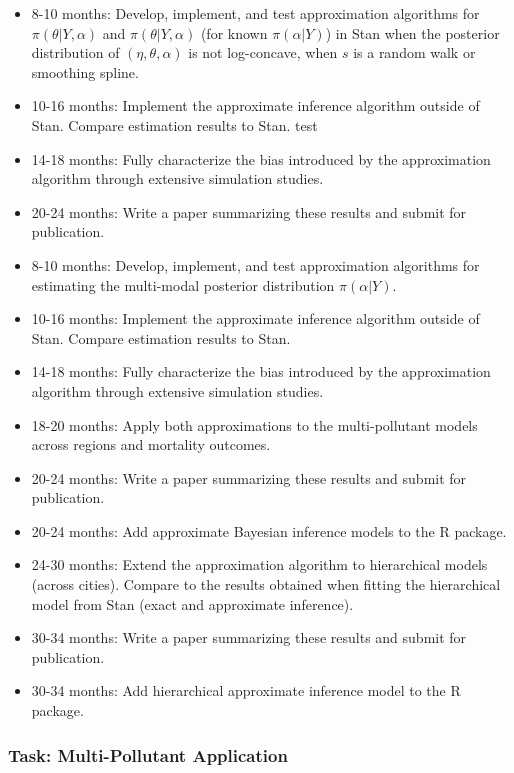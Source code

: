 \documentclass[12pt,letterpaper]{article}
\begin{document}
\begin{itemize}
    \item 8-10 months: Develop, implement, and test approximation algorithms for $\pi( \theta | Y, \alpha )$ and $\pi( \theta | Y, \alpha )$ (for known $\pi(\alpha|Y)$) in Stan when the posterior distribution of $(\eta, \theta, \alpha)$ is not log-concave, when $s$ is a random walk or smoothing spline. 
    \item 10-16 months: Implement the approximate inference algorithm outside of Stan. Compare estimation results to Stan. test 
    \item 14-18 months: Fully characterize the bias introduced by the approximation algorithm through extensive simulation studies. 
    \item 20-24 months: Write a paper summarizing these results and submit for publication. 
    \item 8-10 months: Develop, implement, and test approximation algorithms for estimating the multi-modal posterior distribution $\pi(\alpha|Y)$.
    \item 10-16 months: Implement the approximate inference algorithm outside of Stan. Compare estimation results to Stan.  
    \item 14-18 months: Fully characterize the bias introduced by the approximation algorithm through extensive simulation studies.  
    \item 18-20 months: Apply both approximations to the multi-pollutant models across regions and mortality outcomes.
    \item 20-24 months: Write a paper summarizing these results and submit for publication. 
    \item 20-24 months: Add approximate Bayesian inference models to the R package. 
    \item 24-30 months: Extend the approximation algorithm to hierarchical models (across cities). Compare to the results obtained when fitting the hierarchical model from Stan (exact and approximate inference). 
    \item 30-34 months: Write a paper summarizing these results and submit for publication. 
    \item 30-34 months: Add hierarchical approximate inference model to the R package. 
\end{itemize}

\hypertarget{task-multi-pollutant-application}{%
\subsubsection{Task: Multi-Pollutant
Application}\label{task-multi-pollutant-application}}
\end{document}
